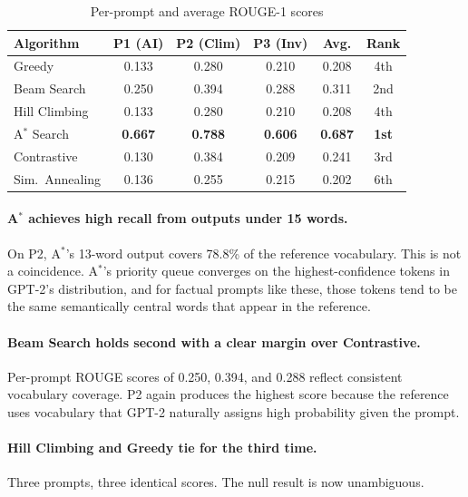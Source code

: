 \documentclass[12pt]{article}
\begin{document}
\begin{table}[ht]
	\centering
	\caption{Per-prompt and average ROUGE-1 scores}
	\label{tab:rouge_boxed}
	\small
	\setlength{\tabcolsep}{4pt}
	\begin{tabularx}{\linewidth}{|X|c|c|c|c|c|}
		\hline
		\textbf{Algorithm} & \textbf{P1 (AI)} & \textbf{P2 (Clim)} & \textbf{P3 (Inv)} & \textbf{Avg.} & \textbf{Rank} \\ \hline
		Greedy          & 0.133 & 0.280 & 0.210 & 0.208 & 4th \\ \hline
		Beam Search     & 0.250 & 0.394 & 0.288 & 0.311 & 2nd \\ \hline
		Hill Climbing   & 0.133 & 0.280 & 0.210 & 0.208 & 4th \\ \hline
		A$^*$ Search    & \textbf{0.667} & \textbf{0.788} & \textbf{0.606} & \textbf{0.687} & \textbf{1st} \\ \hline
		Contrastive     & 0.130 & 0.384 & 0.209 & 0.241 & 3rd \\ \hline
		Sim.\ Annealing & 0.136 & 0.255 & 0.215 & 0.202 & 6th \\ \hline
	\end{tabularx}
\end{table}

	\paragraph{A$^*$ achieves high recall from outputs under 15 words.}
	On P2, A$^*$'s 13-word output covers 78.8\% of the reference vocabulary. This is not a coincidence. A$^*$'s priority queue converges on the highest-confidence tokens in GPT-2's distribution, and for factual prompts like these, those tokens tend to be the same semantically central words that appear in the reference.
	
	\paragraph{Beam Search holds second with a clear margin over Contrastive.}
	Per-prompt ROUGE scores of 0.250, 0.394, and 0.288 reflect consistent vocabulary coverage. P2 again produces the highest score because the reference uses vocabulary that GPT-2 naturally assigns high probability given the prompt.
	
	\paragraph{Hill Climbing and Greedy tie for the third time.}
	Three prompts, three identical scores. The null result is now unambiguous.
	
\end{document}
